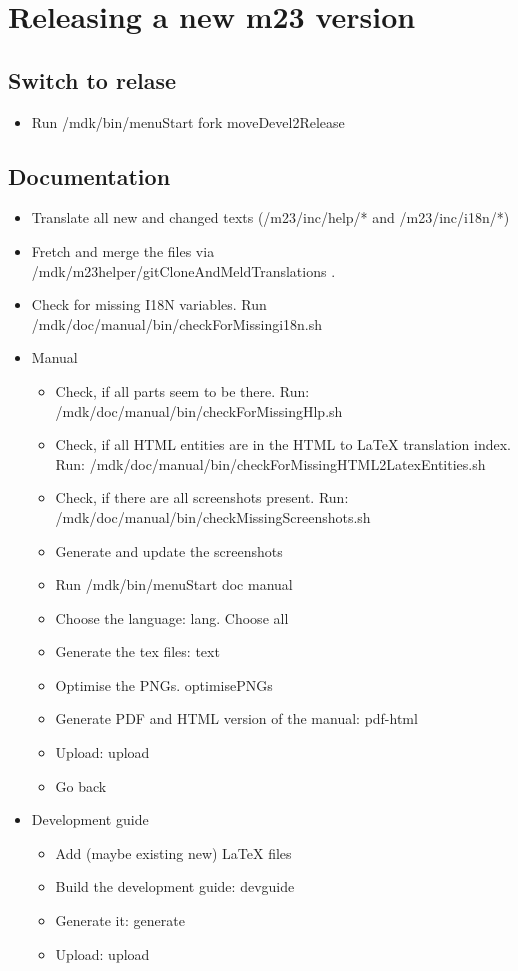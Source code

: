 \section{Releasing a new m23 version}

\subsection{Switch to relase}
\begin{itemize}
	\item Run /mdk/bin/menuStart \Rightarrow fork \Rightarrow moveDevel2Release
\end{itemize}


\subsection{Documentation}
\begin{itemize}
	\item Translate all new and changed texts (/m23/inc/help/* and /m23/inc/i18n/*)
	\item Fretch and merge the files via /mdk/m23helper/gitCloneAndMeldTranslations .
	\item Check for missing I18N variables. Run /mdk/doc/manual/bin/checkForMissingi18n.sh
	\item Manual
	\begin{itemize}
		\item Check, if all parts seem to be there. Run: /mdk/doc/manual/bin/checkForMissingHlp.sh
		\item Check, if all HTML entities are in the HTML to LaTeX translation index. Run: /mdk/doc/manual/bin/checkForMissingHTML2LatexEntities.sh
		\item Check, if there are all screenshots present. Run: /mdk/doc/manual/bin/checkMissingScreenshots.sh
		\item Generate and update the screenshots
		\item Run /mdk/bin/menuStart \Rightarrow doc \Rightarrow manual
		\item Choose the language: \Rightarrow lang. Choose all
		\item Generate the tex files: \Rightarrow text
		\item Optimise the PNGs. \Rightarrow optimisePNGs
		\item Generate PDF and HTML version of the manual: \Rightarrow pdf-html
		\item Upload: \Rightarrow upload
		\item Go back
	\end{itemize}
	\item Development guide
	\begin{itemize}
		\item Add (maybe existing new) LaTeX files
		\item Build the development guide: \Rightarrow devguide
		\item Generate it: \Rightarrow generate
		\item Upload: \Rightarrow upload
	\end{itemize}
\end{itemize}



